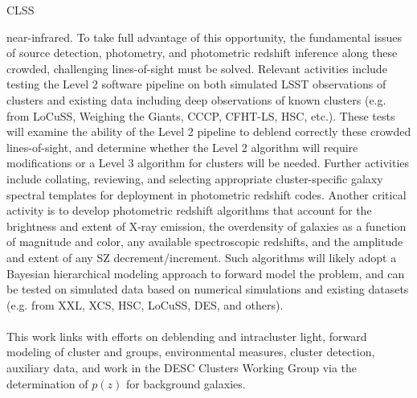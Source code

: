 {\begin{tasklist}{CLSS}
\begin{task}
{near-infrared.  To take full advantage of this opportunity, the 
fundamental issues of source detection, photometry, and photometric 
redshift inference along these crowded, challenging lines-of-sight must 
be solved. Relevant activities include testing the Level 2 
software pipeline on both simulated LSST observations of clusters and 
existing data including deep
observations of known clusters (e.g. from LoCuSS, Weighing the Giants, 
CCCP, CFHT-LS, HSC, etc.).  These tests will examine the ability of 
the Level 2 pipeline to deblend correctly these crowded lines-of-sight,
and determine whether the Level 2 algorithm will require modifications
or a Level 3 algorithm for clusters will be needed.
Further activities include collating, reviewing, and selecting 
appropriate cluster-specific galaxy spectral templates for deployment in 
photometric redshift codes.  
Another critical activity is to develop photometric 
redshift algorithms that account for the brightness and 
extent of X-ray emission, the overdensity of galaxies as a function of 
magnitude and color, any available spectroscopic redshifts, and the 
amplitude and extent of any SZ decrement/increment. 
Such algorithms will 
likely adopt a Bayesian hierarchical modeling approach to forward model 
the problem, and can be tested on simulated data based on numerical 
simulations and existing datasets (e.g. from XXL, XCS, HSC, LoCuSS, DES, 
and others). 
~\\~\\
This work links with efforts on deblending and
intracluster light, forward 
modeling of cluster and groups, environmental measures, cluster 
detection, auxiliary data, and work in the DESC Clusters Working Group 
via the determination of $p(z)$ for background galaxies.}
~\\
\end{task}




\end{tasklist}}
